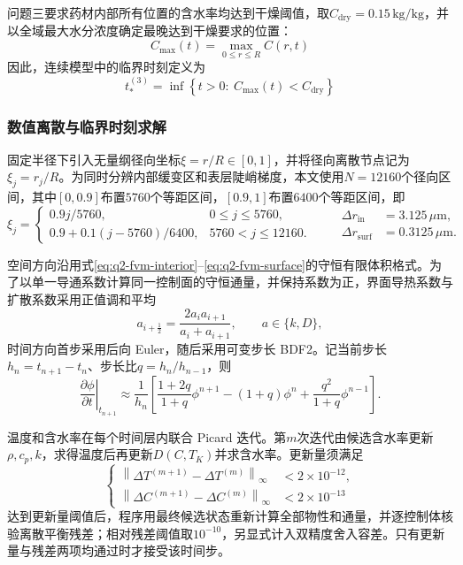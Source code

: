 \documentclass[withoutpreface,bwprint]{cumcmthesis}
\begin{document}
问题三要求药材内部所有位置的含水率均达到干燥阈值，取$C_{\mathrm{dry}}=0.15\,\mathrm{kg/kg}$，并以全域最大水分浓度确定最晚达到干燥要求的位置：
\begin{equation}
C_{\max}(t)=\max_{0\le r\le R}C(r,t)
\label{eq:q3-cmax}
\end{equation}
因此，连续模型中的临界时刻定义为
\begin{equation}
t_*^{(3)}=\inf\left\{t>0:\ C_{\max}(t)< C_{\mathrm{dry}}\right\}
\label{eq:q3-drying-time}
\end{equation}
\subsubsection{数值离散与临界时刻求解}

固定半径下引入无量纲径向坐标$\xi=r/R\in[0,1]$，并将径向离散节点记为$\xi_j=r_j/R$。为同时分辨内部缓变区和表层陡峭梯度，本文使用$N=12160$个径向区间，其中$[0,0.9]$布置$5760$个等距区间，$[0.9,1]$布置$6400$个等距区间，即
\begin{equation}
\xi_j=
\begin{cases}
0.9j/5760, & 0\le j\le5760,\\
0.9+0.1(j-5760)/6400, & 5760<j\le12160.
\end{cases}
\qquad
\begin{aligned}
\Delta r_{\mathrm{in}}&=3.125\,\mu\mathrm m,\\
\Delta r_{\mathrm{surf}}&=0.3125\,\mu\mathrm m.
\end{aligned}
\label{eq:q3-space-grid}
\end{equation}

空间方向沿用式\eqref{eq:q2-fvm-interior}--\eqref{eq:q2-fvm-surface}的守恒有限体积格式。为了以单一导通系数计算同一控制面的守恒通量，并保持系数为正，界面导热系数与扩散系数采用正值调和平均
\begin{equation}
a_{i+\frac12}
=\frac{2a_i a_{i+1}}{a_i+a_{i+1}},
\qquad a\in\{k,D\},
\label{eq:q3-face-harmonic}
\end{equation}
时间方向首步采用后向 Euler，随后采用可变步长 BDF2。记当前步长$h_n=t_{n+1}-t_n$、步长比$q=h_n/h_{n-1}$，则
\begin{equation}
\left.\frac{\partial\phi}{\partial t}\right|_{t_{n+1}}
\approx\frac{1}{h_n}
\left[
\frac{1+2q}{1+q}\phi^{n+1}
-(1+q)\phi^n
+\frac{q^2}{1+q}\phi^{n-1}
\right].
\label{eq:q3-bdf2}
\end{equation}

温度和含水率在每个时间层内联合 Picard 迭代。第$m$次迭代由候选含水率更新$\rho,c_p,k$，求得温度后再更新$D(C,T_K)$并求含水率。更新量须满足
\begin{equation}
\left\{
\begin{aligned}
\left\|\Delta T^{(m+1)}-\Delta T^{(m)}\right\|_\infty
&<2\times10^{-12},\\
\left\|\Delta C^{(m+1)}-\Delta C^{(m)}\right\|_\infty
&<2\times10^{-13}
\end{aligned}
\right.
\label{eq:q3-picard-criterion}
\end{equation}
达到更新量阈值后，程序用最终候选状态重新计算全部物性和通量，并逐控制体核验离散平衡残差；相对残差阈值取$10^{-10}$，另显式计入双精度舍入容差。只有更新量与残差两项均通过时才接受该时间步。
\end{document}
